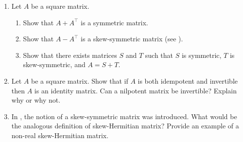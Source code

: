 \begin{enumerate}[!HW!]
\itemspade Using the projection in , draw the image of the unit square under this projection and describe its ``area.''

\item Let $A$ be a square matrix. 
\begin{enumerate}
\item Show that $A+A^\top$ is a symmetric matrix.
\item Show that $A-A^\top$ is a skew-symmetric matrix (see ).
\item Show that there exists matrices $S$ and $T$ such that $S$ is symmetric, $T$ is skew-symmetric, and $A=S+T$.
\end{enumerate}

\item Let $A$ be a square matrix. Show that if $A$ is both idempotent and invertible then $A$ is an identity matrix. Can a nilpotent matrix be invertible? Explain why or why not.

\item In , the notion of a skew-symmetric matrix was introduced. What would be the analogous definition of skew-Hermitian matrix? Provide an example of a non-real skew-Hermitian matrix.
\end{enumerate}

 
 \pagebreak